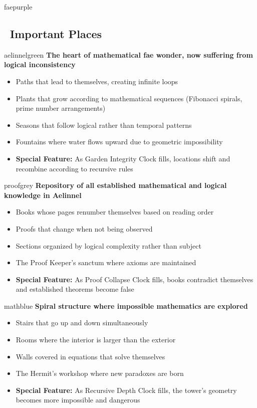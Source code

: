 \documentclass[11pt]{article}
\begin{document}
\begin{campaignsection}{faepurple}
\subsection*{\faBuilding\ Important Places}

\begin{mechanicbox}{aelinnelgreen}
\textbf{The heart of mathematical fae wonder, now suffering from logical inconsistency}
\begin{itemize}
    \item Paths that lead to themselves, creating infinite loops
    \item Plants that grow according to mathematical sequences (Fibonacci spirals, prime number arrangements)
    \item Seasons that follow logical rather than temporal patterns
    \item Fountains where water flows upward due to geometric impossibility
    \item \textbf{Special Feature:} As Garden Integrity Clock fills, locations shift and recombine according to recursive rules
\end{itemize}
\end{mechanicbox}

\begin{mechanicbox}{proofgrey}
\textbf{Repository of all established mathematical and logical knowledge in Aelinnel}
\begin{itemize}
    \item Books whose pages renumber themselves based on reading order
    \item Proofs that change when not being observed
    \item Sections organized by logical complexity rather than subject
    \item The Proof Keeper's sanctum where axioms are maintained
    \item \textbf{Special Feature:} As Proof Collapse Clock fills, books contradict themselves and established theorems become false
\end{itemize}
\end{mechanicbox}

\begin{mechanicbox}{mathblue}
\textbf{Spiral structure where impossible mathematics are explored}
\begin{itemize}
    \item Stairs that go up and down simultaneously
    \item Rooms where the interior is larger than the exterior
    \item Walls covered in equations that solve themselves
    \item The Hermit's workshop where new paradoxes are born
    \item \textbf{Special Feature:} As Recursive Depth Clock fills, the tower's geometry becomes more impossible and dangerous
\end{itemize}
\end{mechanicbox}


\end{campaignsection}
\end{document}
